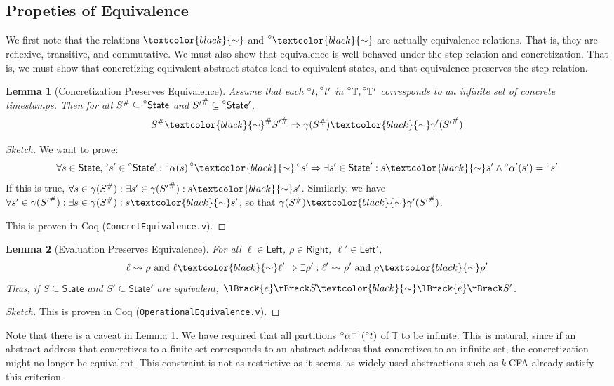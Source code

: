 \documentclass[acmsmall,review]{acmart}\settopmatter{printfolios=true,printccs=false,printacmref=false}
\theoremstyle{definition}
\theoremstyle{plain}
\newtheorem{lem}{Lemma}[section]
\newcommand*{\A}[1]{\prescript{\circ}{}{#1}}
\newcommand*{\Abs}[1]{{#1}^{\#}}
\newcommand*{\Time}{\mathbb{T}}
\newcommand*{\ATime}{\A{\Time}}
\newcommand*{\Left}{\mathsf{Left}}
\newcommand*{\Right}{\mathsf{Right}}
\newcommand*{\State}{\mathsf{State}}
\newcommand*{\AState}{\A{\mathsf{State}}}
\newcommand*{\semarrow}{\rightsquigarrow}
\newcommand*{\equivalent}[1][black]{\textcolor{#1}{\sim}}
\newcommand*{\sembracket}[1]{\lBrack{#1}\rBrack}
\begin{document}
\subsection{Propeties of Equivalence}
We first note that the relations $\equivalent$ and $\A\equivalent$ are actually equivalence relations.
That is, they are reflexive, transitive, and commutative.
We must also show that equivalence is well-behaved under the step relation and concretization.
That is, we must show that concretizing equivalent abstract states lead to equivalent states, and that equivalence preserves the step relation.
\begin{lem}[Concretization Preserves Equivalence]\label{lem:concreteqiuv}
  Assume that each $\A{t},\A{t'}$ in $\ATime,\ATime'$ corresponds to an infinite set of concrete timestamps.
  Then for all $\Abs{S}\subseteq\AState$ and $\Abs{S'}\subseteq\AState'$,
  \[\Abs{S}\Abs\equivalent\Abs{S'}\Rightarrow\gamma(\Abs{S})\equivalent\gamma'(\Abs{S'})\]
\end{lem}
\begin{proof}[Sketch]
  We want to prove:
  \[\forall s\in\State,\A{s}'\in\AState':\A\alpha(s)\A\equivalent\A{s}'\Rightarrow\exists s'\in\State':s\equivalent s'\land\A\alpha'(s')=\A{s}'\]
  If this is true, $\forall s\in\gamma(\Abs{S}):\exists s'\in\gamma(\Abs{S'}):s\equivalent s'$.
  Similarly, we have $\forall s'\in\gamma(\Abs{S'}):\exists s\in\gamma(\Abs{S}):s\equivalent s'$, so that $\gamma(\Abs{S})\equivalent\gamma'(\Abs{S'})$.

  This is proven in Coq (\texttt{ConcretEquivalence.v}).
\end{proof}
\begin{lem}[Evaluation Preserves Equivalence]
  For all $\ell\in\Left$, $\rho\in\Right$, $\ell'\in\Left'$,
  \[\ell\semarrow\rho\text{ and }\ell\equivalent\ell'\Rightarrow\exists\rho':\ell'\semarrow\rho'\text{ and }\rho\equivalent\rho'\]
  Thus, if $S\subseteq\State$ and $S'\subseteq\State'$ are equivalent, $\sembracket{e}S\equivalent\sembracket{e}S'$.
\end{lem}
\begin{proof}[Sketch]
  This is proven in Coq (\texttt{OperationalEquivalence.v}).
\end{proof}
Note that there is a caveat in Lemma \ref{lem:concreteqiuv}.
We have required that all partitions $\A\alpha^{-1}(\A{t})$ of $\Time$ to be infinite.
This is natural, since if an abstract address that concretizes to a finite set corresponds to an abstract address that concretizes to an infinite set, the concretization might no longer be equivalent.
This constraint is not as restrictive as it seems, as widely used abstractions such as \emph{k}-CFA already satisfy this criterion.
\end{document}
